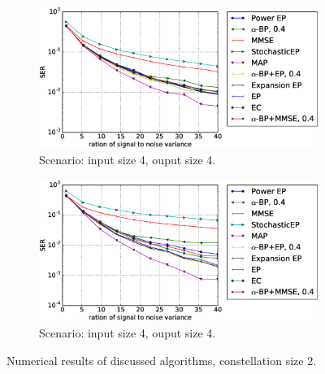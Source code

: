 \documentclass{article}
\begin{document}
\begin{figure}[!t]
  \begin{subfigure}{1\textwidth}
    \includegraphics[width=1\linewidth]{figures/ep_experiments_4by4_bpsk_alpha4.eps}
    \caption{Scenario: input size 4, ouput size 4.}
    \label{fig:compare-const2-44}
  \end{subfigure}
  \begin{subfigure}{1\textwidth}
    \includegraphics[width=1\linewidth]{figures/ep_experiments8by8_bpsk_alpha4.eps}
    \caption{Scenario: input size 4, ouput size 4.}
    \label{fig:compare-const2-88}
  \end{subfigure}
  \caption{Numerical results of discussed algorithms, constellation size 2.}
  \label{fig:compare-const2}
\end{figure}
\end{document}

